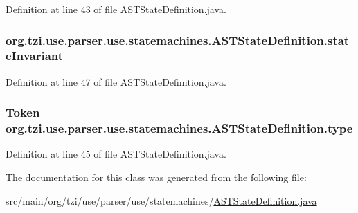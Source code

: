 Definition at line 43 of file A\-S\-T\-State\-Definition.\-java.

\hypertarget{classorg_1_1tzi_1_1use_1_1parser_1_1use_1_1statemachines_1_1_a_s_t_state_definition_aa00d39d5255293472c31bf4843ca53d8}{
\subsubsection[{state\-Invariant}]{ org.\-tzi.\-use.\-parser.\-use.\-statemachines.\-A\-S\-T\-State\-Definition.\-state\-Invariant\hspace{0.3cm}{\ttfamily [protected]}}}\label{classorg_1_1tzi_1_1use_1_1parser_1_1use_1_1statemachines_1_1_a_s_t_state_definition_aa00d39d5255293472c31bf4843ca53d8}


Definition at line 47 of file A\-S\-T\-State\-Definition.\-java.

\hypertarget{classorg_1_1tzi_1_1use_1_1parser_1_1use_1_1statemachines_1_1_a_s_t_state_definition_a3fe6df0731960a92abf4fc5ea85c0829}{
\subsubsection[{type}]{\setlength{\rightskip}{0pt plus 5cm}Token org.\-tzi.\-use.\-parser.\-use.\-statemachines.\-A\-S\-T\-State\-Definition.\-type\hspace{0.3cm}{\ttfamily [protected]}}}\label{classorg_1_1tzi_1_1use_1_1parser_1_1use_1_1statemachines_1_1_a_s_t_state_definition_a3fe6df0731960a92abf4fc5ea85c0829}


Definition at line 45 of file A\-S\-T\-State\-Definition.\-java.



The documentation for this class was generated from the following file\-:\begin{DoxyCompactItemize}
\item 
src/main/org/tzi/use/parser/use/statemachines/\hyperlink{_a_s_t_state_definition_8java}{A\-S\-T\-State\-Definition.\-java}\end{DoxyCompactItemize}
